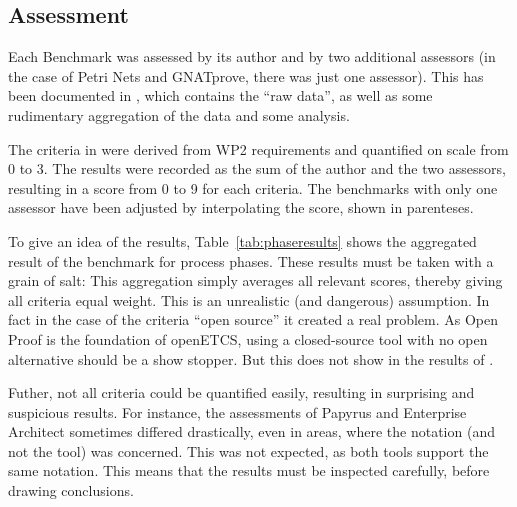\subsection{Assessment}
\label{sec:assessment}

Each Benchmark was assessed by its author and by two additional assessors (in the case of Petri Nets and GNATprove, there was just one assessor).  This has been documented in \citep{WP7_O719}, which contains the ``raw data'', as well as some rudimentary aggregation of the data and some analysis.

The criteria in \citep{WP7_O719} were derived from WP2 requirements and quantified on scale from 0 to 3.  The results were recorded as the sum of the author and the two assessors, resulting in a score from 0 to 9 for each criteria.  The benchmarks with only one assessor have been adjusted by interpolating the score, shown in parenteses.

To give an idea of the results, Table~\ref{tab:phaseresults} shows the aggregated result of the benchmark for process phases.  These results must be taken with a grain of salt: This aggregation simply averages all relevant scores, thereby giving all criteria equal weight.  This is an unrealistic (and dangerous) assumption.  In fact in the case of the criteria ``open source'' it created a real problem.  As Open Proof is the foundation of openETCS, using a closed-source tool with no open alternative should be a show stopper.  But this does not show in the results of \citep{WP7_O719}.

Futher, not all criteria could be quantified easily, resulting in surprising and suspicious results.  For instance, the assessments of Papyrus and Enterprise Architect sometimes differed drastically, even in areas, where the notation (and not the tool) was concerned.  This was not expected, as both tools support the same notation.  This means that the results must be inspected carefully, before drawing conclusions.

